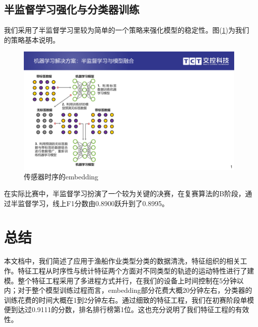 \documentclass[UTF8, 12pt]{ctexart}
\begin{document}
		\subsection{半监督学习强化与分类器训练}
		我们采用了半监督学习里较为简单的一个策略来强化模型的稳定性。图(\ref{sec_2_fake_labels})为我们的策略基本说明。
		\begin{figure}[H]
			\centering
			\includegraphics[width=0.55\linewidth]{..//plots//fake_labels.pdf}
			\caption{传感器时序的embedding}
			\label{sec_2_fake_labels}
			\vspace{-0.2cm}
		\end{figure}
		在实际比赛中，半监督学习扮演了一个较为关键的决赛，在复赛算法的B阶段，通过半监督学习，线上F1分数由0.8900跃升到了0.8995。

		\section{总结}\label{sec_3}
		本文档中，我们简述了应用于渔船作业类型分类的数据清洗，特征组织的相关工作。特征工程从时序性与统计特征两个方面对不同类型的轨迹的运动特性进行了建模。整个特征工程采用了多进程方式并行，在我们的设备上时间控制在5分钟以内；对于整个模型训练过程而言，embedding部分花费大概20分钟左右，分类器的训练花费的时间大概在1到2分钟左右。通过细致的特征工程，我们在初赛阶段单模便到达过0.9111的分数，排名排行榜第1位。这也充分说明了我们特征工程的有效性。

	
	
\end{document}
